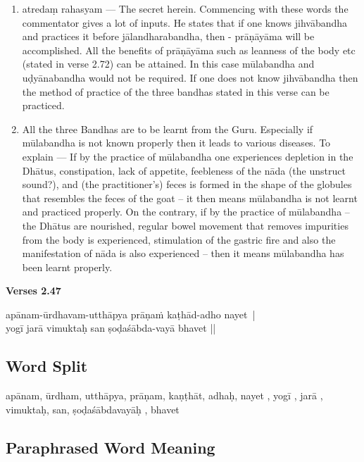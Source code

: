 \begin{enumerate}
\itemsep=0pt
\item atredaṃ rahasyam --- The secret herein. Commencing with these words the commentator gives a lot of inputs. He states that if one knows jihvābandha and practices it before jālandharabandha, then - prāṇāyāma will be accomplished. All the benefits of prāṇāyāma such as leanness of the body etc (stated in verse 2.72) can be attained. In this case mūlabandha and uḍyānabandha would not be required. If one does not know jihvābandha then the method of practice of the three bandhas stated in this verse can be practiced. 
\item All the three Bandhas are to be learnt from the Guru. Especially if mūlabandha is not known properly then it leads to various diseases. To explain --- If by the practice of  mūlabandha one experiences depletion in the Dhātus, constipation, lack of appetite, feebleness of the nāda (the unstruct sound?), and (the practitioner’s) feces is formed in the shape of the globules that resembles the feces of the goat – it then means mūlabandha is not learnt and practiced properly. On the contrary, if by the practice of mūlabandha – the Dhātus are nourished, regular bowel movement that removes impurities from the body is experienced, stimulation of the gastric fire and also the manifestation of nāda is also experienced – then it means mūlabandha has been learnt properly.
\end{enumerate}
\vspace{-5pt}


\noindent \textbf{Verses 2.47}
\vspace{-5pt}

\begin{shloka}
apānam-ūrdhavam-utthāpya prāṇaṁ kaṭhād-adho nayet |\\
yogī jarā vimuktaḥ san ṣoḍaśābda-vayā bhavet ||
\end{shloka}

\subsection*{Word Split}
\vspace{-10pt}

apānam, ūrdham, utthāpya, prāṇam, kaṇṭhāt, adhaḥ, nayet , yogī , jarā , vimuktaḥ, san, ṣoḍaśābdavayāḥ , bhavet

\subsection*{Paraphrased Word Meaning}
\vspace{-10pt}

